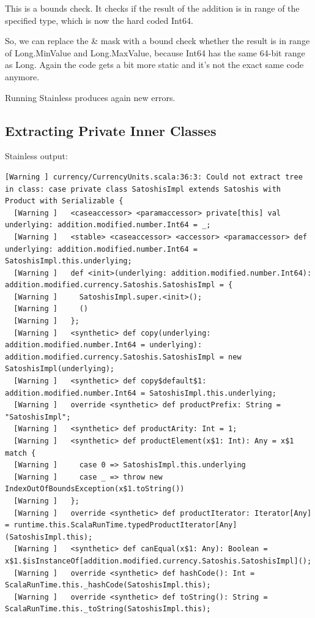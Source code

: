 \documentclass[runningheads]{llncs}
\begin{document}
This is a bounds check.
It checks if the result of the addition is in range of the specified type, which is now the hard coded Int64.

So, we can replace the \& mask with a bound check whether the result is in range of Long.MinValue and Long.MaxValue, because Int64 has the same 64-bit range as Long.
Again the code gets a bit more static and it's not the exact same code anymore.

Running Stainless produces again new errors.


\subsection{Extracting Private Inner Classes}

Stainless output:
\begin{lstlisting}[style=stainless]
  [Warning ] currency/CurrencyUnits.scala:36:3: Could not extract tree in class: case private class SatoshisImpl extends Satoshis with Product with Serializable {
  [Warning ]   <caseaccessor> <paramaccessor> private[this] val underlying: addition.modified.number.Int64 = _;
  [Warning ]   <stable> <caseaccessor> <accessor> <paramaccessor> def underlying: addition.modified.number.Int64 = SatoshisImpl.this.underlying;
  [Warning ]   def <init>(underlying: addition.modified.number.Int64): addition.modified.currency.Satoshis.SatoshisImpl = {
  [Warning ]     SatoshisImpl.super.<init>();
  [Warning ]     ()
  [Warning ]   };
  [Warning ]   <synthetic> def copy(underlying: addition.modified.number.Int64 = underlying): addition.modified.currency.Satoshis.SatoshisImpl = new SatoshisImpl(underlying);
  [Warning ]   <synthetic> def copy$default$1: addition.modified.number.Int64 = SatoshisImpl.this.underlying;
  [Warning ]   override <synthetic> def productPrefix: String = "SatoshisImpl";
  [Warning ]   <synthetic> def productArity: Int = 1;
  [Warning ]   <synthetic> def productElement(x$1: Int): Any = x$1 match {
  [Warning ]     case 0 => SatoshisImpl.this.underlying
  [Warning ]     case _ => throw new IndexOutOfBoundsException(x$1.toString())
  [Warning ]   };
  [Warning ]   override <synthetic> def productIterator: Iterator[Any] = runtime.this.ScalaRunTime.typedProductIterator[Any](SatoshisImpl.this);
  [Warning ]   <synthetic> def canEqual(x$1: Any): Boolean = x$1.$isInstanceOf[addition.modified.currency.Satoshis.SatoshisImpl]();
  [Warning ]   override <synthetic> def hashCode(): Int = ScalaRunTime.this._hashCode(SatoshisImpl.this);
  [Warning ]   override <synthetic> def toString(): String = ScalaRunTime.this._toString(SatoshisImpl.this);

\end{lstlisting}
\end{document}
